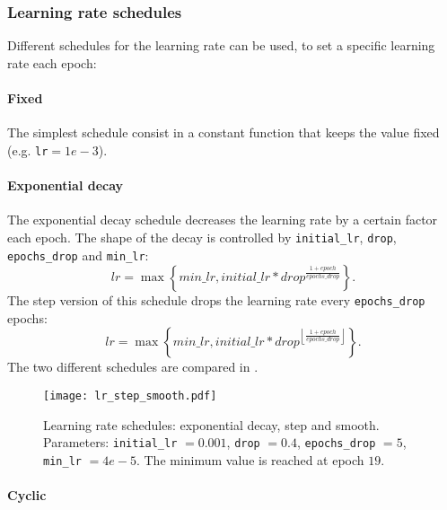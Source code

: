 \subsubsection{Learning rate schedules}

Different schedules for the learning rate can be used, to set a specific learning rate each epoch:

\paragraph{Fixed}

The simplest schedule consist in a constant function that keeps the value fixed
(e.g. \texttt{lr}$=1e-3$).

\paragraph{Exponential decay}

The exponential decay schedule decreases the learning rate by a certain factor
each epoch. The shape of the decay is controlled by \texttt{initial\_lr},
\texttt{drop}, \texttt{epochs\_drop} and \texttt{min\_lr}:
\begin{equation}
    lr =
    \max \left\{ 
        min\_lr,
        initial\_lr * drop ^{ \frac{1 + epoch}{epochs\_drop} }
    \right\}
    .
    \label{eq:lr_smooth}
\end{equation}
The step version of this schedule drops the learning rate every
\texttt{epochs\_drop} epochs:
\begin{equation}
    lr =
    \max \left\{ 
        min\_lr,
        initial\_lr * drop ^{
            \left\lfloor 
                \frac{1 + epoch}{epochs\_drop}
            \right\rfloor
        }
    \right\}
    .
    \label{eq:lr_step}
\end{equation}
The two different schedules are compared in .
\begin{figure}[t!]
    \centering
    \texttt{[image: lr\_step\_smooth.pdf]}
    \caption{Learning rate schedules: exponential decay, step and smooth.
        Parameters:
        \texttt{initial\_lr} $=0.001$,
        \texttt{drop} $=0.4$,
        \texttt{epochs\_drop} $=5$,
        \texttt{min\_lr} $=4e-5$.
        The minimum value is reached at epoch $19$.}%
    \label{fig:lr_step_smooth}
\end{figure}

\paragraph{Cyclic}

